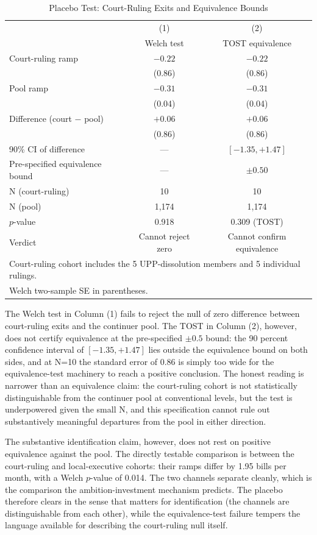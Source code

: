 \documentclass[11pt]{article}
\begin{document}
\begin{table}[H]
\centering
\caption{Placebo Test: Court-Ruling Exits and Equivalence Bounds}
\label{tab:placebo}
\begin{tabular}{lcc}
\toprule
& (1) & (2) \\
& Welch test & TOST equivalence \\
\midrule
Court-ruling ramp & $-0.22$ & $-0.22$ \\
& (0.86) & (0.86) \\
Pool ramp & $-0.31$ & $-0.31$ \\
& (0.04) & (0.04) \\
Difference (court $-$ pool) & $+0.06$ & $+0.06$ \\
& (0.86) & (0.86) \\
90\% CI of difference & --- & $[-1.35, +1.47]$ \\
Pre-specified equivalence bound & --- & $\pm 0.50$ \\
\midrule
N (court-ruling) & 10 & 10 \\
N (pool) & 1{,}174 & 1{,}174 \\
$p$-value & 0.918 & 0.309 (TOST) \\
Verdict & Cannot reject zero & Cannot confirm equivalence \\
\bottomrule
\multicolumn{3}{l}{\footnotesize Court-ruling cohort includes the 5 UPP-dissolution members and 5 individual rulings.} \\
\multicolumn{3}{l}{\footnotesize Welch two-sample SE in parentheses.} \\
\end{tabular}
\end{table}

The Welch test in Column (1) fails to reject the null of zero difference between court-ruling exits and the continuer pool. The TOST in Column (2), however, does not certify equivalence at the pre-specified $\pm 0.5$ bound: the 90 percent confidence interval of $[-1.35, +1.47]$ lies outside the equivalence bound on both sides, and at N=10 the standard error of 0.86 is simply too wide for the equivalence-test machinery to reach a positive conclusion. The honest reading is narrower than an equivalence claim: the court-ruling cohort is not statistically distinguishable from the continuer pool at conventional levels, but the test is underpowered given the small N, and this specification cannot rule out substantively meaningful departures from the pool in either direction.

The substantive identification claim, however, does not rest on positive equivalence against the pool. The directly testable comparison is between the court-ruling and local-executive cohorts: their ramps differ by 1.95 bills per month, with a Welch $p$-value of 0.014. The two channels separate cleanly, which is the comparison the ambition-investment mechanism predicts. The placebo therefore clears in the sense that matters for identification (the channels are distinguishable from each other), while the equivalence-test failure tempers the language available for describing the court-ruling null itself.
\end{document}
